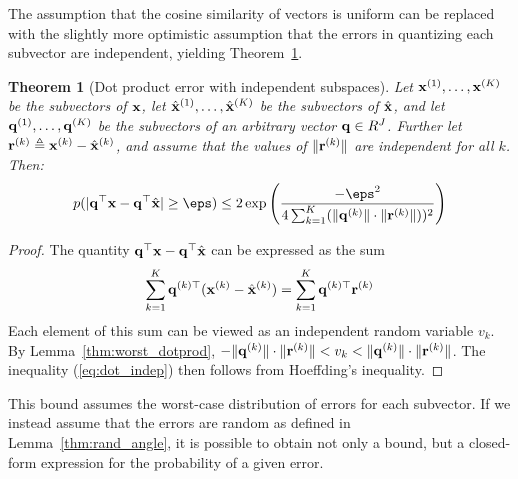 \documentclass[]{article}
\newtheorem{theorem}{Theorem}[section]
\begin{document}

The assumption that the cosine similarity of vectors is uniform can be replaced with the slightly more optimistic assumption that the errors in quantizing each subvector are independent, yielding Theorem~\ref{thm:dot_indep}.

\begin{theorem}[Dot product error with independent subspaces] \label{thm:dot_indep}
Let $\mathbf{x}^{(1)},\ldots,\mathbf{x}^{(K)}$ be the subvectors of $\mathbf{x}$, let $\hat{\mathbf{x}}^{(1)},\ldots,\hat{\mathbf{x}}^{(K)}$ be the subvectors of $\hat{\mathbf{x}}$, and let $\mathbf{q}^{(1)},\ldots,\mathbf{q}^{(K)}$ be the subvectors of an arbitrary vector $\mathbf{q} \in R^J$. Further let $\mathbf{r}^{(k)} \triangleq \mathbf{x}^{(k)} - \hat{\mathbf{x}}^{(k)}$, and assume that the values of $\lVert \mathbf{r}^{(k)} \rVert$ are independent for all $k$. Then: %
\begin{align} \label{eq:dot_indep}
    p(\abs{\q^\top \x - \q^\top \xhat} \ge \eps) \le 2\exp \left( \frac{-\eps^2}{
        4 \sum_{k=1}^K (\norm{\q^{(k)}} \cdot \norm{ \r^{(k)} }))^2
    }\right)
\end{align}
\end{theorem}

\begin{proof}
The quantity $\mathbf{q}^\top \mathbf{x} - \mathbf{q}^\top \hat{\mathbf{x}}$ can be expressed as the sum
\begin{align}
    \sum_{k=1}^K \mathbf{q}^{(k)\top} (\mathbf{x}^{(k)} - \hat{\mathbf{x}}^{(k)}) = \sum_{k=1}^K \mathbf{q}^{(k)\top} \mathbf{r}^{(k)}
\end{align}
Each element of this sum can be viewed as an independent random variable $v_k$. By Lemma~\ref{thm:worst_dotprod}, $-\lVert\mathbf{q}^{(k)}\rVert \cdot \lVert\mathbf{r}^{(k)}\rVert < v_k < \lVert\mathbf{q}^{(k)}\rVert \cdot \lVert\mathbf{r}^{(k)}\rVert$. The inequality (\ref{eq:dot_indep}) then follows from Hoeffding's inequality.
\end{proof}

This bound assumes the worst-case distribution of errors for each subvector. If we instead assume that the errors are random as defined in Lemma~\ref{thm:rand_angle}, it is possible to obtain not only a bound, but a closed-form expression for the probability of a given error.
\end{document}

